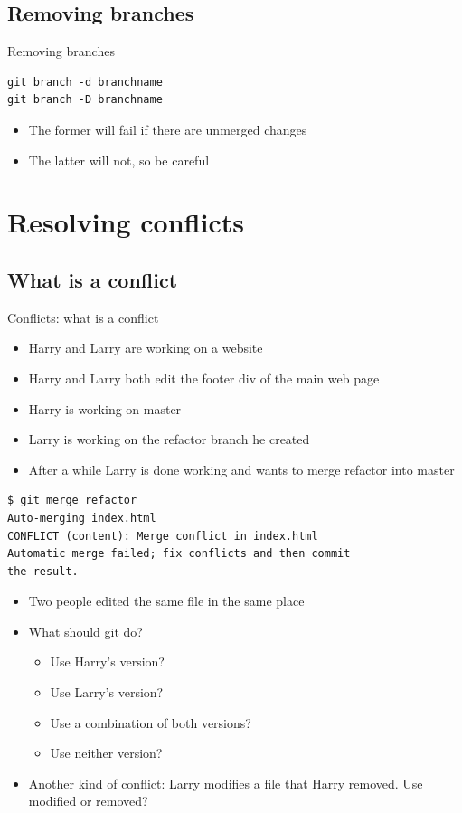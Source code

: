 \documentclass[10pt,a4paper]{beamer}
\begin{document}
\subsection{Removing branches}
\begin{frame}[fragile]{Removing branches}
\begin{verbatim}
git branch -d branchname
git branch -D branchname
\end{verbatim}
\begin{itemize}
\item The former will fail if there are unmerged changes
\item The latter will not, so be careful
\end{itemize}
\end{frame}


\section{Resolving conflicts}

\subsection{What is a conflict}
\begin{frame}{Conflicts: what is a conflict}
\begin{itemize}
	\item Harry and Larry are working on a website
	\item Harry and Larry both edit the footer div of the main web page
	\item Harry is working on master
	\item Larry is working on the refactor branch he created
	\item After a while Larry is done working and wants to merge refactor into master
\end{itemize}
\end{frame}

\begin{frame}[fragile]
\begin{verbatim}
$ git merge refactor
Auto-merging index.html
CONFLICT (content): Merge conflict in index.html
Automatic merge failed; fix conflicts and then commit
the result.
\end{verbatim}
\begin{itemize}
	\item Two people edited the same file in the same place
	\item What should git do?
	\begin{itemize}
	\item Use Harry's version?
	\item Use Larry's version?
	\item Use a combination of both versions?
	\item Use neither version?
	\end{itemize}

	\item Another kind of conflict: Larry modifies a file that Harry removed. Use modified or removed?
\end{itemize}
\end{frame}
\end{document}
